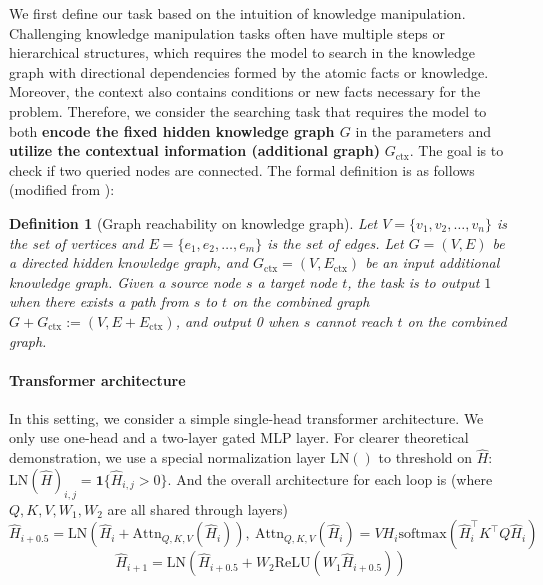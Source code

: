 \documentclass[]{bytedance_seed}
\newcommand{\1}{\mathbf{1}}
\newtheorem{definition}{Definition}
\begin{document}
{We first define our task based on the intuition of knowledge manipulation. Challenging knowledge manipulation tasks often have multiple steps or hierarchical structures, which requires the model to search in the knowledge graph with directional dependencies formed by the atomic facts or knowledge. Moreover, the context also contains conditions or new facts necessary for the problem. Therefore, we consider the searching task that requires the model to both \textbf{encode the fixed hidden knowledge graph $G$} in the parameters and \textbf{utilize the contextual information (additional graph)} $G_{\text{ctx}}$. The goal is to check if two queried nodes are connected. The formal definition is as follows (modified from \cite{zhu2025reasoning}):
\begin{definition}[Graph reachability on knowledge graph]
    Let $V = \{v_1, v_2, \ldots, v_n\}$ is the set
of vertices and $E = \{e_1, e_2, \ldots, e_m\}$ is the set of edges. Let $G = (V, E)$ be a directed hidden knowledge graph, and $G_{\text{ctx}}=(V,E_{\text{ctx}})$ be an input additional knowledge graph. 
Given a source node $s$ a target node $t$, the task is to output $1$ when there exists a path from $s$ to $t$ on the combined graph $G+G_{\text{ctx}}:= (V,E+E_{\text{ctx}})$, and output 0 when $s$ cannot reach $t$ on the combined graph.
\end{definition}
\paragraph{Transformer architecture} In this setting, we consider a simple single-head transformer architecture. We only use one-head and a two-layer gated MLP layer. For clearer theoretical demonstration, we use a special normalization layer $\mathrm{LN}()$ to threshold on $\hat{H}$: $\mathrm{LN}(\hat{H})_{i,j}=\mathbf{1}\{\hat{H}_{i,j}>0\}$. And the overall architecture for each loop is (where $Q,K,V,W_1,W_2$ are all shared through layers)
$$\hat{H}_{i+0.5}=\mathrm{LN}(\hat{H}_i+\mathrm{Attn}_{Q,K,V}(\hat{H}_i)),\ \mathrm{Attn}_{Q,K,V}(\hat{H}_i)=VH_i\text{softmax}(\hat{H}_i^\top K^\top Q\hat{H}_i)$$
$$\hat{H}_{i+1}=\mathrm{LN}(\hat{H}_{i+0.5}+W_2 \mathrm{ReLU}(W_1\hat{H}_{i+0.5}))$$

}
\end{document}
